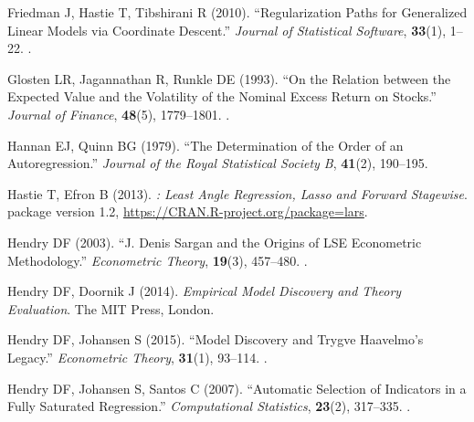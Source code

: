 \documentclass[article,nojss]{jss}
\begin{document}
\begin{thebibliography}{56}
	Friedman J, Hastie T, Tibshirani R (2010).
	\newblock \enquote{Regularization Paths for Generalized Linear Models via
		Coordinate Descent.}
	\newblock \emph{Journal of Statistical Software}, \textbf{33}(1), 1--22.
	\newblock {}.
	
	Glosten LR, Jagannathan R, Runkle DE (1993).
	\newblock \enquote{On the Relation between the Expected Value and the
		Volatility of the Nominal Excess Return on Stocks.}
	\newblock \emph{Journal of Finance}, \textbf{48}(5), 1779--1801.
	\newblock {}.
	
	Hannan EJ, Quinn BG (1979).
	\newblock \enquote{The Determination of the Order of an Autoregression.}
	\newblock \emph{Journal of the Royal Statistical Society B}, \textbf{41}(2),
	190--195.
	
	Hastie T, Efron B (2013).
	\newblock \emph{: Least Angle Regression, Lasso and Forward
		Stagewise}.
	\newblock {} package version 1.2,
	\urlprefix\url{https://CRAN.R-project.org/package=lars}.
	
	Hendry DF (2003).
	\newblock \enquote{J. Denis Sargan and the Origins of LSE Econometric
		Methodology.}
	\newblock \emph{Econometric Theory}, \textbf{19}(3), 457--480.
	\newblock {}.
	
	Hendry DF, Doornik J (2014).
	\newblock \emph{Empirical Model Discovery and Theory Evaluation}.
	\newblock The MIT Press, London.
	
	Hendry DF, Johansen S (2015).
	\newblock \enquote{Model Discovery and Trygve Haavelmo's Legacy.}
	\newblock \emph{Econometric Theory}, \textbf{31}(1), 93--114.
	\newblock {}.
	
	Hendry DF, Johansen S, Santos C (2007).
	\newblock \enquote{Automatic Selection of Indicators in a Fully Saturated
		Regression.}
	\newblock \emph{Computational Statistics}, \textbf{23}(2), 317--335.
	\newblock {}.
	

\end{thebibliography}
\end{document}
